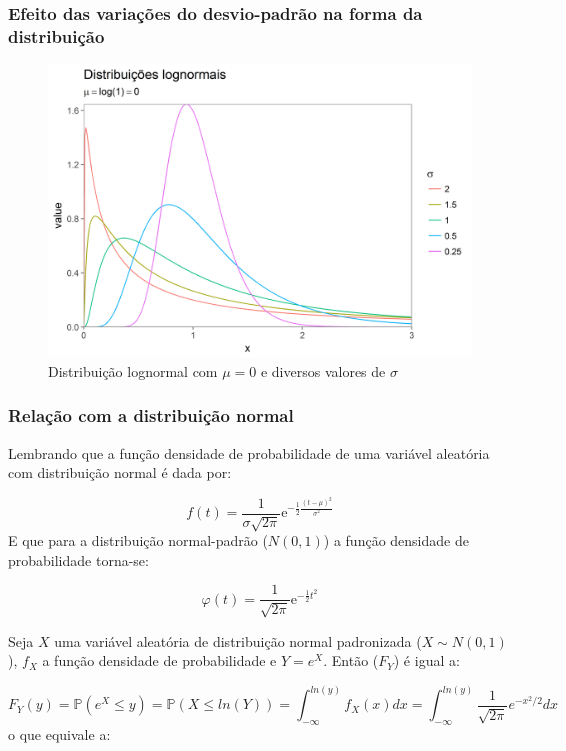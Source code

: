 \documentclass[a4paper]{article}
\begin{document}
\subsubsection{Efeito das variações do desvio-padrão na forma da
distribuição}\label{efeito-das-variacoes-do-desvio-padrao-na-forma-da-distribuicao}

\begin{figure}[H]

{\centering \includegraphics[width=0.7\linewidth]{images/logs-1} 

}

\caption{Distribuição lognormal com $\mu = 0$ e diversos valores de $\sigma$}\label{fig:logs}
\end{figure}

\subsubsection{Relação com a distribuição
normal}\label{relacao-com-a-distribuicao-normal}

Lembrando que a função densidade de probabilidade de uma variável
aleatória com distribuição normal é dada por:

\[f(t) = \frac{1}{\sigma\sqrt{2\pi}}\mathrm{e}^{-\frac{1}{2}\frac{(t-\mu)^2}{\sigma^2}}\]
E que para a distribuição normal-padrão (\(N(0,1)\)) a função densidade
de probabilidade torna-se:

\[\varphi(t) = \frac{1}{\sqrt{2\pi}}\mathrm{e}^{-\frac{1}{2}t^2}\]

Seja \(X\) uma variável aleatória de distribuição normal padronizada
(\(X \sim N(0, 1)\)), \(f_X\) a função densidade de probabilidade e
\(Y = e^X\). Então (\(F_Y\)) é igual a:

\[F_Y(y) = \mathbb{P}(e^X\leq y) = \mathbb{P}(X \leq ln(Y)) = \int_{-\infty}^{ln(y)}f_X(x)dx = \int_{-\infty}^{ln(y)}\frac{1}{\sqrt{2\pi}}e^{-x^2/2}dx\]
o que equivale a:
\end{document}
